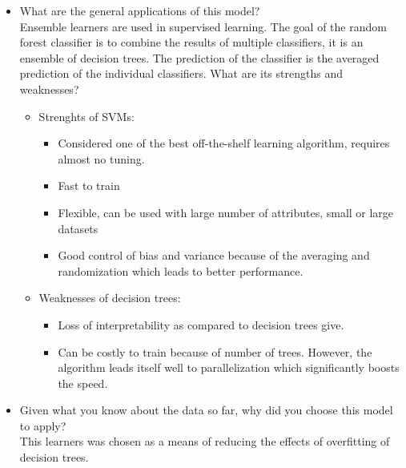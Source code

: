 \documentclass[12pt]{article}
\begin{document}
\begin{itemize}
\item What are the general applications of this model?\\
Ensemble learners are used in supervised learning. The goal of the random forest classifier is to combine the results of multiple classifiers, it is an ensemble of decision trees. The prediction of the classifier is the averaged prediction of the individual classifiers. 
What are its strengths and weaknesses?\\
\begin{itemize}[noitemsep,nolistsep]
       \item Strenghts of SVMs:
              \begin{itemize}[noitemsep,nolistsep]
                     \item Considered one of the best off-the-shelf learning algorithm, requires almost no tuning. 
                     \item Fast to train
                     \item Flexible, can be used with large number of attributes, small or large datasets
                     \item Good control of bias and variance because of the averaging and randomization which leads to better performance.
              \end{itemize}
       \item Weaknesses of decision trees:
              \begin{itemize}[noitemsep,nolistsep]
                     \item Loss of interpretability as compared to decision trees give.
                     \item Can be costly to train because of number of trees. However, the algorithm leads itself well to parallelization which significantly boosts the speed.
              \end{itemize}
       \end{itemize}


\item Given what you know about the data so far, why did you choose this model to apply?\\
This learners was chosen as a means of reducing the effects of overfitting of decision trees.
\end{itemize} 



\end{document}
